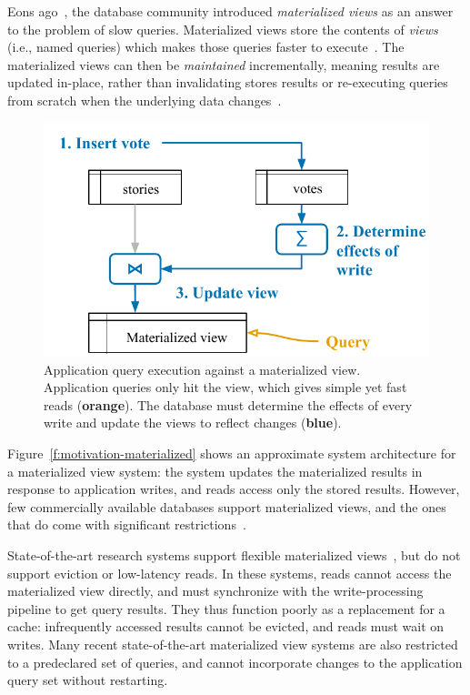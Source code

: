 
Eons ago~\cite{relational-materialized-views,stonebraker-views}, the database
community introduced \textit{materialized views} as an answer to the problem of
slow queries. Materialized views store the contents of \textit{views} (i.e.,
named queries) which makes those queries faster to
execute~\cite{materialized-views}. The materialized views can then be
\textit{maintained} incrementally, meaning results are updated in-place, rather
than invalidating stores results or re-executing queries from scratch when the
underlying data changes~\cite{materialized-survey}.

\begin{figure}
  \centering
  \includegraphics{diagrams/Motivation Materialized Views.pdf}
  \caption{Application query execution against a materialized view. Application
  queries only hit the view, which gives simple yet fast reads
  (\textbf{\color{set2}orange}). The database must determine the effects of
  every write and update the views to reflect changes
  (\textbf{\color{set1}blue}).}
  \label{f:motivation-materialized}
\end{figure}

Figure~\vref{f:motivation-materialized} shows an approximate system architecture
for a materialized view system: the system updates the materialized results in
response to application writes, and reads access only the stored results.
However, few commercially available databases support materialized views, and
the ones that do come with significant
restrictions~\cite{mssql-materialized-view-restrictions}.

State-of-the-art research systems support flexible materialized
views~\cite{dbtoaster,materialize}, but do not support eviction or low-latency
reads. In these systems, reads cannot access the materialized view directly, and
must synchronize with the write-processing pipeline to get query results. They
thus function poorly as a replacement for a cache: infrequently accessed results
cannot be evicted, and reads must wait on writes. Many recent state-of-the-art
materialized view systems are also restricted to a predeclared set of queries,
and cannot incorporate changes to the application query set without restarting.

